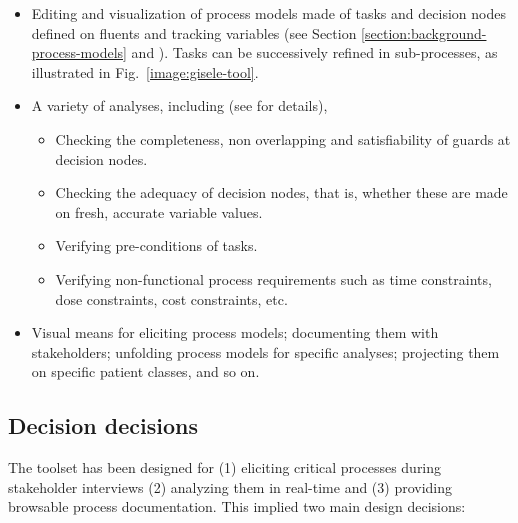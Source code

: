 \begin{itemize}
\item Editing and visualization of process models made of tasks and decision nodes defined on fluents and tracking variables (see Section \ref{section:background-process-models} and \cite{Damas:2009, Damas:2011}). Tasks can be successively refined in sub-processes, as illustrated in Fig.~\ref{image:gisele-tool}.
\item A variety of analyses, including (see \cite{Damas:2011} for details),
\begin{itemize}
\item Checking the completeness, non overlapping and satisfiability of guards at decision nodes.
\item Checking the adequacy of decision nodes, that is, whether these are made on fresh, accurate variable values.
\item Verifying pre-conditions of tasks.
\item Verifying non-functional process requirements such as time constraints, dose constraints, cost constraints, etc.
\end{itemize}
\item Visual means for eliciting process models; documenting them with stakeholders; unfolding process models for specific analyses; projecting them on specific patient classes, and so on.
\end{itemize}

\subsection*{Decision decisions}

The toolset has been designed for (1) eliciting critical processes during stakeholder interviews (2) analyzing them in real-time and (3) providing browsable process documentation. This implied two main design decisions:

